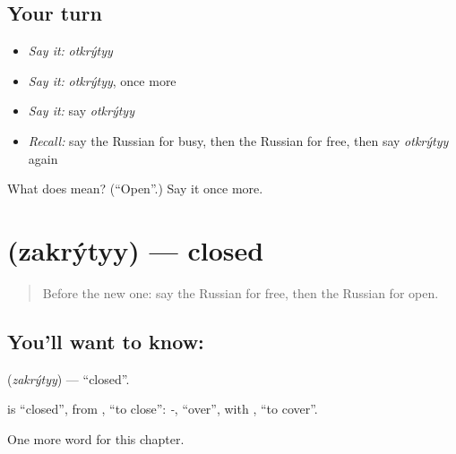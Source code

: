 \subsection*{Your turn}
\begin{itemize}
\raggedright
  \item \emph{Say it:} \emph{otkrýtyy}
  \item \emph{Say it:} \emph{otkrýtyy}, once more
  \item \emph{Say it:} say \emph{otkrýtyy}
  \item \emph{Recall:} say the Russian for busy, then the Russian for free, then say \emph{otkrýtyy} again
\end{itemize}

\begin{tcolorbox}[breakable,colback=teal!4,colframe=teal!35!black,title={Before you move on}]
What does  mean? (\textquotedblleft{}Open\textquotedblright{}.) Say it once more.
\end{tcolorbox}
\section[\texorpdfstring{\ru{закрытый} (zakrýtyy)}{закрытый (zakrýtyy)}]{ (zakrýtyy) — closed}

\label{lesson:RU-C125-closed}



\begin{quote}
Before the new one: say the Russian for free, then the Russian for open.
\end{quote}

\subsection*{You'll want to know: }
\textbf{} (\emph{zakrýtyy}) — \textquotedblleft{}closed\textquotedblright{}.

\begin{cousinweb}
\textbf{} is \textquotedblleft{}closed\textquotedblright{}, from \emph{}, \textquotedblleft{}to close\textquotedblright{}: \emph{-}, \textquotedblleft{}over\textquotedblright{}, with \emph{}, \textquotedblleft{}to cover\textquotedblright{}.
\end{cousinweb}

\begin{grammarlens}[title={What you've built}]
One more word for this chapter.
\end{grammarlens}

